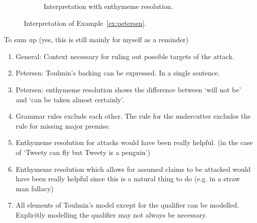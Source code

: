 \begin{figure}
\begin{subfigure}[b]{\textwidth}
		\caption{Interpretation with enthymeme resolution.}
	\end{subfigure}
	\caption{Interpretation of Example~\ref{ex:petersen}.}
	\label{fig:petersen}
\end{figure}

To sum up (yes, this is still mainly for myself as a reminder)
\begin{enumerate}
\item General: Context necessary for ruling out possible targets of the attack.
\item Petersen: Toulmin's backing can be expressed. In a single sentence.
\item Petersen: enthymeme resolution shows the difference between `will not be' and `can be taken almost certainly'.
\item Grammar rules exclude each other. The rule for the undercutter excludes the rule for missing major premise.
\item Enthymeme resolution for attacks would have been really helpful. (in the case of `Tweety can fly but Tweety is a penguin')
\item Enthymeme resolution which allows for assumed claims to be attacked would have been really helpful since this is a natural thing to do (e.g. in a straw man fallacy)
\item All elements of Toulmin's model except for the qualifier can be modelled. Explicitly modelling the qualifier may not always be necessary.
\end{enumerate}

